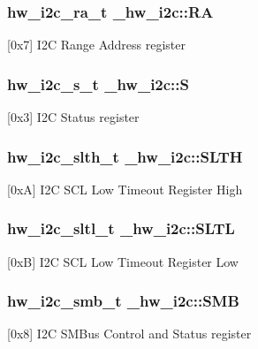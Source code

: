 \subsubsection[{\texorpdfstring{RA}{RA}}]{ {\bf hw\+\_\+i2c\+\_\+ra\+\_\+t} \+\_\+hw\+\_\+i2c\+::\+RA}\hypertarget{struct__hw__i2c_a1b3d34b5c52f3d3b15d1ee67e95ee84c}{}\label{struct__hw__i2c_a1b3d34b5c52f3d3b15d1ee67e95ee84c}
\mbox{[}0x7\mbox{]} I2C Range Address register 
\subsubsection[{\texorpdfstring{S}{S}}]{ {\bf hw\+\_\+i2c\+\_\+s\+\_\+t} \+\_\+hw\+\_\+i2c\+::S}\hypertarget{struct__hw__i2c_a327449bbb229afc73bbf913379198836}{}\label{struct__hw__i2c_a327449bbb229afc73bbf913379198836}
\mbox{[}0x3\mbox{]} I2C Status register 
\subsubsection[{\texorpdfstring{S\+L\+TH}{SLTH}}]{ {\bf hw\+\_\+i2c\+\_\+slth\+\_\+t} \+\_\+hw\+\_\+i2c\+::\+S\+L\+TH}\hypertarget{struct__hw__i2c_a40ec44b385ce62222d6ceddc4beca39f}{}\label{struct__hw__i2c_a40ec44b385ce62222d6ceddc4beca39f}
\mbox{[}0xA\mbox{]} I2C S\+CL Low Timeout Register High 
\subsubsection[{\texorpdfstring{S\+L\+TL}{SLTL}}]{ {\bf hw\+\_\+i2c\+\_\+sltl\+\_\+t} \+\_\+hw\+\_\+i2c\+::\+S\+L\+TL}\hypertarget{struct__hw__i2c_ab3913e9aacd90d62255434b2f1cb43c2}{}\label{struct__hw__i2c_ab3913e9aacd90d62255434b2f1cb43c2}
\mbox{[}0xB\mbox{]} I2C S\+CL Low Timeout Register Low 
\subsubsection[{\texorpdfstring{S\+MB}{SMB}}]{ {\bf hw\+\_\+i2c\+\_\+smb\+\_\+t} \+\_\+hw\+\_\+i2c\+::\+S\+MB}\hypertarget{struct__hw__i2c_a5a11b7d7df6e7bf1cc6287c3f9b8e3df}{}\label{struct__hw__i2c_a5a11b7d7df6e7bf1cc6287c3f9b8e3df}
\mbox{[}0x8\mbox{]} I2C S\+M\+Bus Control and Status register 

